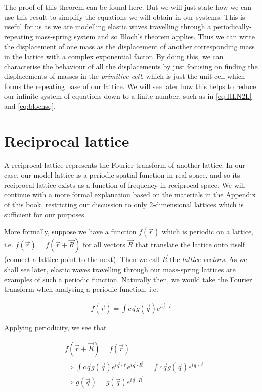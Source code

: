 The proof of this theorem can be found here.\cite{kittel} But we will just
state how we can use this result to simplify the equations we will obtain in
our systems. This is useful for us as we are modelling elastic waves travelling
through a periodically-repeating mass-spring system and so Bloch's theorem
applies. Thus we can write the displacement of one mass as the displacement of
another corresponding mass in the lattice with a complex exponential factor. By
doing this, we can characterise the behaviour of all the displacements by just
focusing on finding the displacements of masses in the \textit{primitive cell},
which is just the unit cell which forms the repeating base of our lattice. We
will see later how this helps to reduce our infinite system of equations down
to a finite number, such as in \eqref{eq:HLN2L} and \eqref{eq:blochsq}.

\section{Reciprocal lattice}
A reciprocal lattice represents the Fourier transform of another lattice. In
our case, our model lattice is a periodic spatial function in real space, and
so its reciprocal lattice exists as a function of frequency in reciprocal
space.  We will continue with a more formal explanation based on the materials
in the Appendix of this book,\cite{moldinglight} restricting our discussion to
only 2-dimensional lattices which is sufficient for our purposes.

More formally, suppose we have a function $f(\vec{r})$ which is periodic on a
lattice, i.e. $f(\vec{r})=f(\vec{r}+\vec{R})$ for all vectors $\vec{R}$
that translate the lattice onto itself (connect a lattice point to the next).
Then we call $\vec{R}$ the \textit{lattice vectors}. As we shall see later,
elastic waves travelling through our mass-spring lattices are examples of such
a periodic function. Naturally then, we would take the Fourier transform when analysing a periodic function, i.e.

\begin{align}
  f(\vec{r})=\int c\vec{q}g(\vec{q})e^{i\vec{q}\cdot\vec{r}}
\label{eq:fg}
\end{align}

Applying periodicity, we see that

\begin{align}
  &f(\vec{r}+\vec{R})=f(\vec{r}) \\
  &\Rightarrow\int c\vec{q}g(\vec{q})e^{i\vec{q}\cdot\vec{r}}e^{i\vec{q}\cdot\vec{R}}=\int c\vec{q}g(\vec{q})e^{i\vec{q}\cdot\vec{r}} \\
  &\Rightarrow g(\vec{q})=g(\vec{q})e^{i\vec{q}\cdot\vec{R}}
\label{eq:fg}
\end{align}

